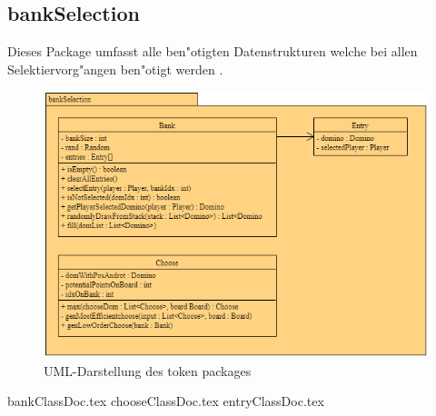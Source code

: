 \subsection{bankSelection}
\label{ss:bankSelection}
\FloatBarrier
Dieses Package umfasst alle ben"otigten Datenstrukturen welche bei allen Selektiervorg"angen ben"otigt werden . 

\begin{figure}
	\centering
	\includegraphics{pics/bankSelectionUMLPackage}
	\caption{UML-Darstellung des token packages}
	\label{fig:bankSelectionPackage}
\end{figure}

{bankClassDoc.tex}
{chooseClassDoc.tex}
{entryClassDoc.tex}